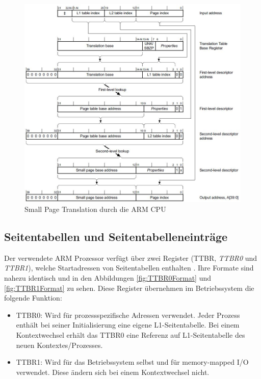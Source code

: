 \begin{figure}[H]
	\includegraphics[scale=0.8]{chapters/mmu/figures/smallPageTranslation}
	\caption{Small Page Translation durch die ARM CPU \cite[S. B3-1337]{ARM:ARM}}
	\label{fig:smallPageTranslation}
\end{figure}

\subsection{Seitentabellen und Seitentabelleneinträge}
\label{subsect:pageTables}

Der verwendete ARM Prozessor verfügt über zwei Register (\acf{TTBR}, \emph{TTBR0} und \emph{TTBR1}), welche Startadressen von Seitentabellen enthalten  \cite[S. B3-1320]{ARM:ARM}. Ihre Formate sind nahezu identisch und in den Abbildungen \ref{fig:TTBR0Format} und \ref{fig:TTBR1Format} zu sehen. Diese Register übernehmen im Betriebssystem die folgende Funktion:

\begin{itemize}
	\item TTBR0: Wird für prozessspezifische Adressen verwendet. Jeder Prozess enthält bei seiner Initialisierung eine eigene L1-Seitentabelle. Bei einem Kontextwechsel erhält das TTBR0 eine Referenz auf L1-Seitentabelle des neuen Kontextes/Prozesses.
	\item TTBR1: Wird für das Betriebssystem selbst und für memory-mapped I/O verwendet. Diese ändern sich bei einem Kontextwechsel nicht.
\end{itemize}


